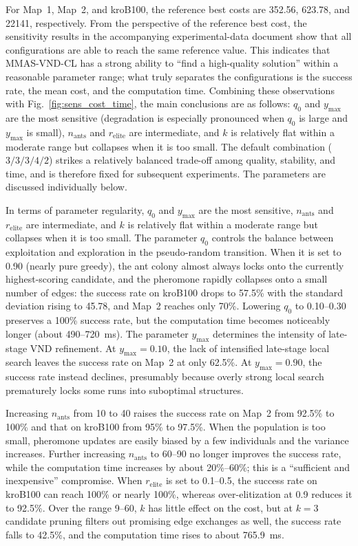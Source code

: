 For Map~1, Map~2, and kroB100, the reference best costs are 352.56, 623.78, and 22141, respectively. From the perspective of the reference best cost, the sensitivity results in the accompanying experimental-data document show that all configurations are able to reach the same reference value. This indicates that MMAS-VND-CL has a strong ability to ``find a high-quality solution'' within a reasonable parameter range; what truly separates the configurations is the success rate, the mean cost, and the computation time. Combining these observations with Fig.~\textcolor{blue}{\ref{fig:sens_cost_time}}, the main conclusions are as follows: $q_0$ and $y_{\max}$ are the most sensitive (degradation is especially pronounced when $q_0$ is large and $y_{\max}$ is small), $n_{\mathrm{ants}}$ and $r_{\mathrm{elite}}$ are intermediate, and $k$ is relatively flat within a moderate range but collapses when it is too small. The default combination ($3/3/3/4/2$) strikes a relatively balanced trade-off among quality, stability, and time, and is therefore fixed for subsequent experiments. The parameters are discussed individually below.

In terms of parameter regularity, $q_0$ and $y_{\max}$ are the most sensitive, $n_{\mathrm{ants}}$ and $r_{\mathrm{elite}}$ are intermediate, and $k$ is relatively flat within a moderate range but collapses when it is too small. The parameter $q_0$ controls the balance between exploitation and exploration in the pseudo-random transition. When it is set to 0.90 (nearly pure greedy), the ant colony almost always locks onto the currently highest-scoring candidate, and the pheromone rapidly collapses onto a small number of edges: the success rate on kroB100 drops to 57.5\% with the standard deviation rising to 45.78, and Map~2 reaches only 70\%. Lowering $q_0$ to 0.10--0.30 preserves a 100\% success rate, but the computation time becomes noticeably longer (about 490--720~ms). The parameter $y_{\max}$ determines the intensity of late-stage VND refinement. At $y_{\max}=0.10$, the lack of intensified late-stage local search leaves the success rate on Map~2 at only 62.5\%. At $y_{\max}=0.90$, the success rate instead declines, presumably because overly strong local search prematurely locks some runs into suboptimal structures.

Increasing $n_{\mathrm{ants}}$ from 10 to 40 raises the success rate on Map~2 from 92.5\% to 100\% and that on kroB100 from 95\% to 97.5\%. When the population is too small, pheromone updates are easily biased by a few individuals and the variance increases. Further increasing $n_{\mathrm{ants}}$ to 60--90 no longer improves the success rate, while the computation time increases by about 20\%--60\%; this is a ``sufficient and inexpensive'' compromise. When $r_{\mathrm{elite}}$ is set to 0.1--0.5, the success rate on kroB100 can reach 100\% or nearly 100\%, whereas over-elitization at 0.9 reduces it to 92.5\%. Over the range 9--60, $k$ has little effect on the cost, but at $k=3$ candidate pruning filters out promising edge exchanges as well, the success rate falls to 42.5\%, and the computation time rises to about 765.9~ms.


